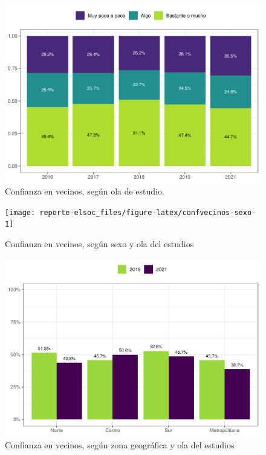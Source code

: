 \documentclass[
  12pt,
]{book}
\begin{document}
\begin{figure}

{\centering \includegraphics{reporte-elsoc_files/figure-latex/vecinos-ola-1} 

}

\caption{Confianza en vecinos, según ola de estudio.}\label{fig:vecinos-ola}
\end{figure}

\begin{figure}

{\centering \texttt{[image: reporte-elsoc\_files/figure-latex/confvecinos-sexo-1]} 

}

\caption{Confianza en vecinos, según sexo y ola del estudios}\label{fig:confvecinos-sexo}
\end{figure}

\begin{figure}

{\centering \includegraphics{reporte-elsoc_files/figure-latex/vecinos-zona-1} 

}

\caption{Confianza en vecinos, según zona geográfica y ola del estudios}\label{fig:vecinos-zona}
\end{figure}
\end{document}
